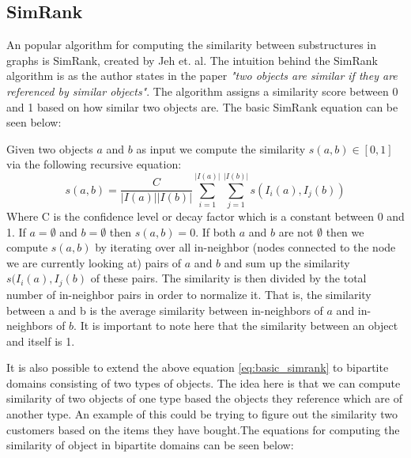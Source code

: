 \subsection{SimRank}
An popular algorithm for computing the similarity between substructures in graphs is SimRank, created by Jeh et. al\cite{10.1145/775047.775126}. The intuition behind the SimRank algorithm is as the author states in the paper \emph{"two objects are similar if they are referenced by similar objects"}\cite{10.1145/775047.775126}. The algorithm assigns a similarity score between 0 and 1 based on how similar two objects are. The basic SimRank equation can be seen below:
\begin{definition}[SimRank]\label{def:simrank} Given two objects $a$ and $b$ as input we compute the similarity $s(a,b) \in [0,1]$ via the following recursive equation:
	\begin{equation}\label{eq:basic_simrank}
	s(a,b)= \frac{C}{|I(a)||I(b)|}\sum^{|I(a)|}_{i=1}\sum^{|I(b)|}_{j=1}s(I_i(a),I_j(b))
	\end{equation}
	Where C is the confidence level or decay factor which is a constant between 0 and 1. If $a=\emptyset$ and $b= \emptyset$ then $s(a,b) = 0$. If both $a$ and $b$ are not $\emptyset$ then we compute $s(a,b)$ by iterating over all in-neighbor (nodes connected to the node we are currently looking at) pairs of $a$ and $b$ and sum up the similarity $s(I_i(a),I_j(b)$ of these pairs. The similarity is then divided by the total number of in-neighbor pairs in order to normalize it. That is, the similarity between a and b is the average similarity between in-neighbors of $a$ and in-neighbors of $b$. It is important to note here that the similarity between an object and itself is 1\cite{10.1145/775047.775126}.
\end{definition}

It is also possible to extend the above equation \ref{eq:basic_simrank} to bipartite domains consisting of two types of objects. The idea here is that we can compute similarity of two objects of one type based the objects they reference which are of another type. An example of this could be trying to figure out the similarity two customers based on the items they have bought\cite{10.1145/775047.775126}.The equations for computing the similarity of object in bipartite domains can be seen below:

